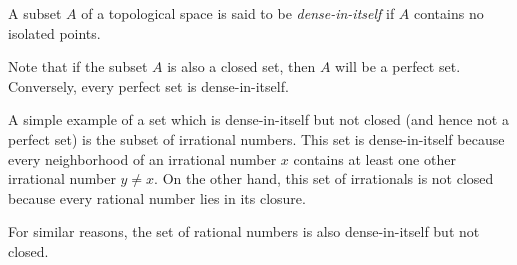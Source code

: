 \documentclass[12pt]{article}
\begin{document}
A subset $A$ of a topological space is said to be \emph{dense-in-itself} if $A$ contains no isolated points.

Note that if the subset $A$ is also a closed set, then $A$ will be a perfect set.  Conversely, every perfect set is dense-in-itself.

A simple example of a set which is dense-in-itself but not closed (and hence not a perfect set) is the subset of irrational numbers.  This set is dense-in-itself because every neighborhood of an irrational number $x$ contains at least one other irrational number $y \ne x$.  On the other hand, this set of irrationals is not closed because every rational number lies in its closure.

For similar reasons, the set of rational numbers is also dense-in-itself but not closed.
\end{document}
